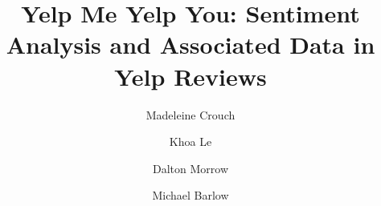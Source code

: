 \documentclass[acmtog]{acmart}
\begin{document}
\title{Yelp Me Yelp You: Sentiment Analysis and Associated Data in Yelp Reviews} 
\author{Madeleine Crouch}
\author{Khoa Le}
\author{Dalton Morrow}
\author{Michael Barlow}



\maketitle

\renewcommand{\shortauthors}{M. Crouch et al.}


\end{document}
